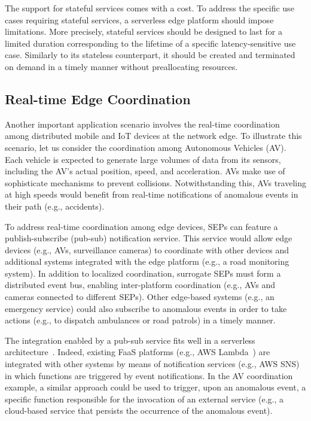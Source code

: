 The support for stateful services comes with a cost. To address the specific use cases requiring stateful services, a serverless edge platform should impose limitations. More precisely, stateful services should be designed to last for a limited duration corresponding to the lifetime of a specific latency-sensitive use case. Similarly to its stateless counterpart, it should be created and terminated on demand in a timely manner without preallocating resources.

\subsection{Real-time Edge Coordination}

Another important application scenario involves the real-time coordination among distributed mobile and IoT devices at the network edge. To illustrate this scenario, let us consider the coordination among Autonomous Vehicles (AV). Each vehicle is expected to generate large volumes of data from its sensors, including the AV's actual position, speed, and acceleration. AVs make use of sophisticate mechanisms to prevent collisions. Notwithstanding this, AVs traveling at high speeds would benefit from real-time notifications of anomalous events in their path (e.g., accidents). 

To address real-time coordination among edge devices, SEPs can feature a publish-subscribe (pub-sub) notification service. This service would allow edge devices (e.g., AVs, surveillance cameras) to coordinate with other devices and additional systems integrated with the edge platform (e.g., a road monitoring system). In addition to localized coordination, surrogate SEPs must form a distributed event bus, enabling inter-platform coordination (e.g., AVs and cameras connected to different SEPs). Other edge-based systems (e.g., an emergency service) could also subscribe to anomalous events in order to take actions (e.g., to dispatch ambulances or road patrols) in a timely manner.

The integration enabled by a pub-sub service fits well in a serverless architecture~\cite{Lloyd18serverless}. Indeed, existing FaaS platforms (e.g., AWS Lambda~\cite{AWSLambda}) are integrated with other systems by means of notification services (e.g., AWS SNS) in which functions are triggered by event notifications. In the AV coordination example, a similar approach could be used to trigger, upon an anomalous event, a specific function responsible for the invocation of an external service (e.g., a cloud-based service that persists the occurrence of the anomalous event). 

